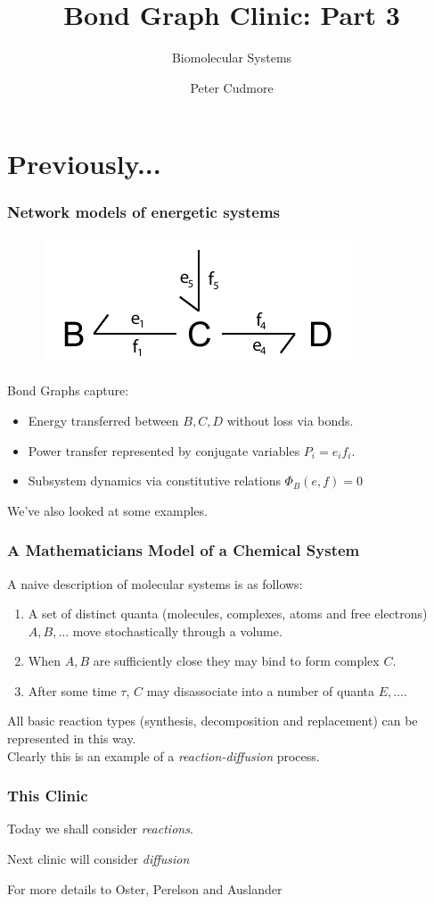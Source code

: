 \documentclass[11pt,reqno]{beamer}
\title{Bond Graph Clinic: Part 3}
\subtitle{Biomolecular Systems}
\author{Peter Cudmore}
\institute{Systems Biology Lab, The University of Melbourne}
\begin{document}
	\begin{frame}
	\titlepage
	\addtocounter{framenumber}{-1} 
\end{frame}
\begin{frame}
\tableofcontents[hideallsubsections]
\end{frame}
\section{Previously...}
\begin{frame}
\frametitle{Network models of energetic systems}
\begin{figure}
	\includegraphics{images/bondgraph.pdf}
\end{figure}
Bond Graphs capture:
\begin{itemize}
	\item Energy transferred between $B,C,D$ without loss via bonds.
	\item Power transfer represented by conjugate variables $P_i=e_if_i$.
	\item Subsystem dynamics via constitutive relations $\Phi_B(e,f) = 0$
\end{itemize}
We've also looked at some examples.
\end{frame}
\begin{frame}
\frametitle{A Mathematicians Model of a Chemical System}
A naive description of molecular systems is as follows:
\begin{enumerate}
	\item A set of distinct quanta (molecules, complexes, atoms and free electrons) $A, B, \ldots$ move stochastically through a volume.
	\item When $A, B$ are sufficiently close they may bind to form complex $C$.
	\item After some time $\tau$, $C$ may disassociate into a number of quanta $E, \ldots$.
\end{enumerate}
All basic reaction types (synthesis, decomposition and replacement) can be represented in this way.\\
\vspace*{10pt}
Clearly this is an example of a \emph{reaction-diffusion} process.
\end{frame}
\begin{frame}
\frametitle{This Clinic}
Today we shall consider \emph{reactions}.
\vfill

Next clinic will consider \emph{diffusion}

\vfill

For more details to Oster, Perelson and Auslander \cite{Oster:1971aa, Oster:1971ab, Oster:1973aa, Oster:1974aa, Perelson:1974, Auslander:1972aa}
\end{frame}
\end{document}
